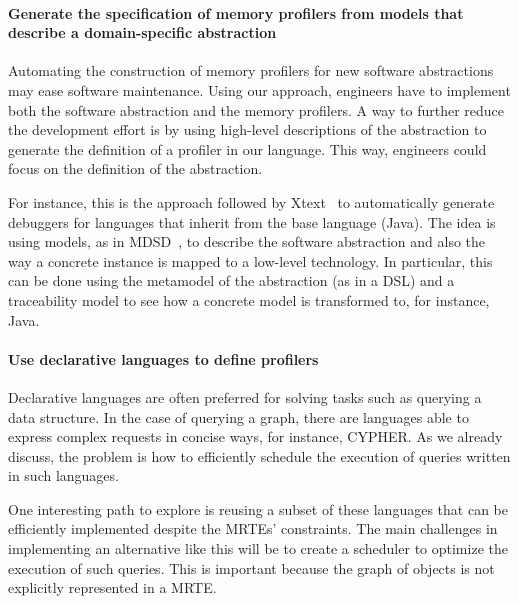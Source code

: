 \paragraph{Generate the specification of memory profilers from models that describe a domain-specific abstraction}
Automating the construction of memory profilers for new software abstractions may ease software maintenance.
Using our approach, engineers have to implement both the software abstraction and the memory profilers.
A way to further reduce the development effort is by using high-level descriptions of the abstraction to generate the definition of a profiler in our language.
This way, engineers could focus on the definition of the abstraction. 

For instance, this is the approach followed by Xtext~\cite{Eysholdt:2010:XIY:1869542.1869625} to automatically generate debuggers for languages that inherit from the base language (Java).
The idea is using models, as in \gls{MDSD}~\cite{Stahl:2006:MSD:1196766, Fowler:2010:DSL:1809745}, to describe the software abstraction and also the way a concrete instance is mapped to a low-level technology.
In particular, this can be done using the metamodel of the abstraction (as in a DSL) and a traceability model to see how a concrete model is transformed to, for instance, Java.

\paragraph{Use declarative languages to define profilers}
Declarative languages are often preferred for solving tasks such as querying a data structure.
In the case of querying a graph, there are languages able to express complex requests in concise ways, for instance, CYPHER.
As we already discuss, the problem is how to efficiently schedule the execution of queries written in such languages.

One interesting path to explore is reusing a subset of these languages that can be efficiently implemented despite the MRTEs' constraints.
The main challenges in implementing an alternative like this will be to create a scheduler to optimize the execution of such queries.
This is important because the graph of objects is not explicitly represented in a MRTE.



